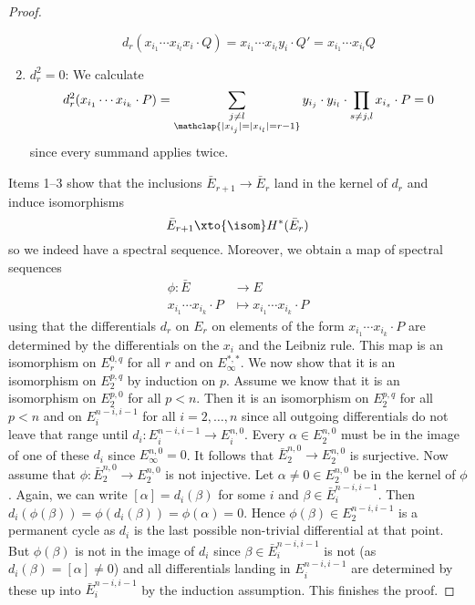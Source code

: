 \begin{proof}
\begin{enumerate}
\begin{smallproof}
				\begin{equation*}
					d_r(x_{i_1} \cdots x_{i_l} x_i \cdot Q) = x_{i_1} \cdots x_{i_l} y_i \cdot Q' = x_{i_1} \cdots x_{i_l} Q
				\end{equation*}
			\end{smallproof}
		\item $d_r^2 = 0$: We calculate
			\begin{equation*}
				d_r^2(x_{i_1} \cdots x_{i_k} \cdot P) = \sum_{\substack{j \neq l \\ \mathclap{|x_{i_j}| = |x_{i_l}| = r - 1}}} y_{i_j} \cdot y_{i_l} \cdot \prod_{s \neq j, l} x_{i_s} \cdot P = 0
			\end{equation*}
			since every summand applies twice.
	\end{enumerate}
	Items 1--3 show that the inclusions $\bar{E}_{r + 1} \to \bar{E}_r$ land in the kernel of $d_r$ and induce isomorphisms
	\begin{equation*}
		\bar{E}_{r + 1} \xto{\isom} H^*(\bar{E}_r)
	\end{equation*}
	so we indeed have a spectral sequence.
	Moreover, we obtain a map of spectral sequences 
	\begin{align*}
		\phi\colon \bar{E} &\to E \\
		x_{i_1} \cdots x_{i_k} \cdot P &\mapsto x_{i_1} \cdots x_{i_k} \cdot P
	\end{align*}
	using that the differentials $d_r$ on $E_r$ on elements of the form $x_{i_1} \cdots x_{i_k} \cdot P$ are determined by the differentials on the $x_i$ and the Leibniz rule.
	This map is an isomorphism on $E_r^{0, q}$ for all $r$ and on $E_\infty^{*, *}$.
	We now show that it is an isomorphism on $E_2^{p, q}$ by induction on $p$.
	Assume we know that it is an isomorphism on $E_2^{p, 0}$ for all $p < n$. 
	Then it is an isomorphism on $E_2^{p, q}$ for all $p < n$ and on $E_i^{n - i, i - 1}$ for all $i = 2, \ldots, n$ since all outgoing differentials do not leave that range until $d_i\colon E_i^{n - i, i - 1} \to E_i^{n, 0}$.
	Every $\alpha \in E_2^{n, 0}$ must be in the image of one of these $d_i$ since $E_\infty^{n, 0} = 0$.
	It follows that $\bar{E}_2^{n, 0} \to E_2^{n, 0}$ is surjective.
	Now assume that $\phi\colon \bar{E}_2^{n, 0} \to E_2^{n, 0}$ is not injective.
	Let $\alpha \neq 0 \in E_2^{n, 0}$ be in the kernel of $\phi$.
	Again, we can write $[\alpha] = d_i(\beta)$ for some $i$ and $\beta \in \bar{E}_i^{n - i, i - 1}$.
	Then $d_i(\phi(\beta)) = \phi(d_i(\beta)) = \phi(\alpha) = 0$.
	Hence $\phi(\beta) \in E_2^{n - i, i - 1}$ is a permanent cycle as $d_i$ is the last possible non-trivial differential at that point.
	But $\phi(\beta)$ is not in the image of $d_i$ since $\beta \in \bar{E}_i^{n - i, i - 1}$ is not (as $d_i(\beta) = [\alpha] \neq 0$) and all differentials landing in $E_i^{n - i, i - 1}$ are determined by these up into $\bar{E}_i^{n - i, i - 1}$ by the induction assumption.
	This finishes the proof.
\end{proof}
